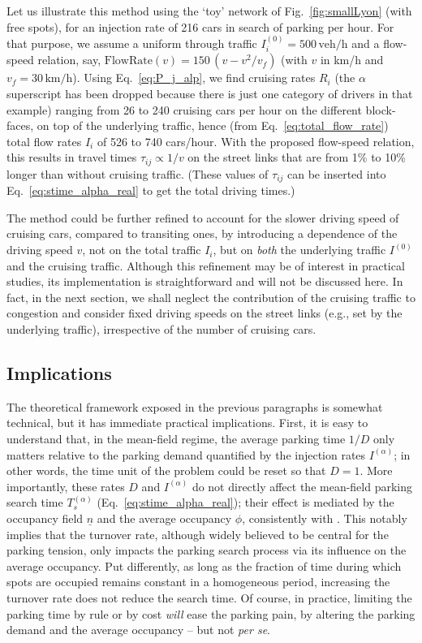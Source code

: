 \documentclass[trsc,reprint]{informs3}
\newcommand{\alp}{^{(\alpha)}}
\newcommand{\AN}[1]{#1}
\begin{document}
{Let us illustrate this method using the `toy' network of Fig.~\ref{fig:smallLyon} (with free spots), for an injection rate of 216 cars in search of parking per hour. For that purpose, we assume a uniform through traffic $I^{(0)}_i=500\,\mathrm{veh/h}$ and
a flow-speed relation, say, $\mathrm{FlowRate}(v)=150\,(v-v^2/v_f)$ (with $v$ in km/h and $v_f=30\,\mathrm{km/h}$).
Using Eq.~\ref{eq:P_j_alp}, we find cruising rates $R_i$ (the $\alpha$ superscript has been dropped
because there is just one category of drivers in that example) ranging from 26 to 240 cruising cars per hour on the different block-faces, on top of the underlying traffic, hence (from Eq.~\ref{eq:total_flow_rate})
total flow rates $I_i$ of 526 to 740 cars/hour. With the proposed flow-speed relation, this results in travel times $\tau_{ij}\propto 1/v$ on the street links 
that are from 1\% to 10\% longer than without cruising traffic. (These values of $\tau_{ij}$ 
can be inserted into Eq.~\ref{eq:stime_alpha_real} to get the total driving times.)

The method could be further refined to account for the slower driving speed of cruising cars, compared to transiting ones, by introducing a dependence of the driving speed $v$, not on the 
total traffic $I_i$, but on \emph{both} the underlying traffic  $I^{(0)}$ and the cruising traffic. 
Although this refinement may be of interest in practical studies, its implementation is straightforward and will not be discussed here.
In fact, in the next section, we shall neglect the contribution of the cruising traffic
to congestion and consider fixed driving speeds on the
street links (e.g., set by the underlying traffic), irrespective of the number of cruising cars.
}


\subsection{Implications}

The theoretical framework exposed in the previous paragraphs is somewhat technical, but it has immediate
practical implications. First, it is easy to understand that, in the mean-field regime, the average parking time $1/D$ only matters relative to the parking demand quantified by the injection rates $I\alp$; in other words, the time unit
of the problem could be reset so that $D=1$. More importantly, these rates $D$ and $I\alp$ do not
directly affect the mean-field parking search time $T_s\alp$ (Eq.~\ref{eq:stime_alpha_real}); their
effect is mediated by the occupancy field $\underline{n}$ and the average occupancy $\phi$, 
\AN{consistently with \citep{dowling2019modeling}}.
This notably implies that the turnover rate, although widely believed to be central for the parking tension, only impacts the parking search process via its influence on the average occupancy. Put differently, as long as the fraction of time during which spots are occupied remains constant in a homogeneous period, increasing the turnover rate does not reduce the search time.  Of course, in practice, limiting the parking time by rule or by cost \emph{will} ease the parking pain, by altering the parking demand and the average occupancy -- but not \emph{per se}.
\end{document}
